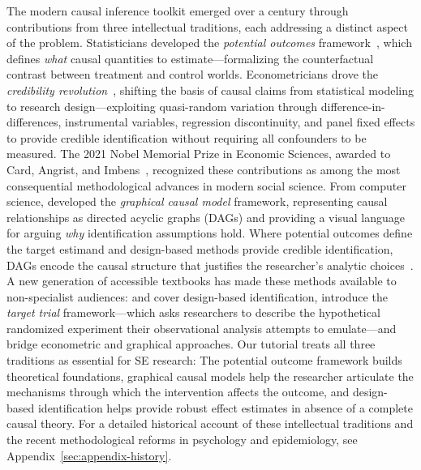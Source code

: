 The modern causal inference toolkit emerged over a century through contributions from three intellectual traditions, each addressing a distinct aspect of the problem.
Statisticians developed the \emph{potential outcomes} framework~\cite{neyman1923application, rubin1974estimating}, which defines \emph{what} causal quantities to estimate---formalizing the counterfactual contrast between treatment and control worlds.
Econometricians drove the \emph{credibility revolution}~\cite{angrist2010credibility}, shifting the basis of causal claims from statistical modeling to research design---exploiting quasi-random variation through difference-in-differences, instrumental variables, regression discontinuity, and panel fixed effects to provide credible identification without requiring all confounders to be measured.
The 2021 Nobel Memorial Prize in Economic Sciences, awarded to Card, Angrist, and Imbens~\cite{nobelprize2021economics}, recognized these contributions as among the most consequential methodological advances in modern social science.
From computer science, \citet{pearl2009causality} developed the \emph{graphical causal model} framework, representing causal relationships as directed acyclic graphs (DAGs) and providing a visual language for arguing \emph{why} identification assumptions hold.
Where potential outcomes define the target estimand and design-based methods provide credible identification, DAGs encode the causal structure that justifies the researcher's analytic choices~\cite{morgan2015counterfactuals, imbens2020potential}.
A new generation of accessible textbooks has made these methods available to non-specialist audiences: \citet{angrist2009mostly} and \citet{cunningham2021causal} cover design-based identification, \citet{hernan2020causal} introduce the \emph{target trial} framework---which asks researchers to describe the hypothetical randomized experiment their observational analysis attempts to emulate---and \citet{huntingtonklein2021effect} bridge econometric and graphical approaches.
Our tutorial treats all three traditions as essential for SE research: The potential outcome framework builds theoretical foundations, graphical causal models help the researcher articulate the mechanisms through which the intervention affects the outcome, and design-based identification helps provide robust effect estimates in absence of a complete causal theory.
For a detailed historical account of these intellectual traditions and the recent methodological reforms in psychology and epidemiology, see Appendix~\ref{sec:appendix-history}.

